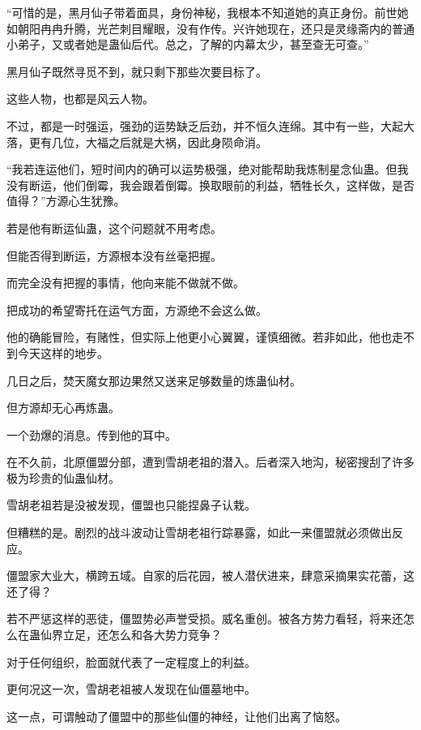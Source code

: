 
\begin{this_body}

“可惜的是，黑月仙子带着面具，身份神秘，我根本不知道她的真正身份。前世她如朝阳冉冉升腾，光芒刺目耀眼，没有作传。兴许她现在，还只是灵缘斋内的普通小弟子，又或者她是蛊仙后代。总之，了解的内幕太少，甚至查无可查。”

黑月仙子既然寻觅不到，就只剩下那些次要目标了。

这些人物，也都是风云人物。

不过，都是一时强运，强劲的运势缺乏后劲，并不恒久连绵。其中有一些，大起大落，更有几位，大福之后就是大祸，因此身陨命消。

“我若连运他们，短时间内的确可以运势极强，绝对能帮助我炼制星念仙蛊。但我没有断运，他们倒霉，我会跟着倒霉。换取眼前的利益，牺牲长久，这样做，是否值得？”方源心生犹豫。

若是他有断运仙蛊，这个问题就不用考虑。

但能否得到断运，方源根本没有丝毫把握。

而完全没有把握的事情，他向来能不做就不做。

把成功的希望寄托在运气方面，方源绝不会这么做。

他的确能冒险，有赌性，但实际上他更小心翼翼，谨慎细微。若非如此，他也走不到今天这样的地步。

几日之后，焚天魔女那边果然又送来足够数量的炼蛊仙材。

但方源却无心再炼蛊。

一个劲爆的消息。传到他的耳中。

在不久前，北原僵盟分部，遭到雪胡老祖的潜入。后者深入地沟，秘密搜刮了许多极为珍贵的仙蛊仙材。

雪胡老祖若是没被发现，僵盟也只能捏鼻子认栽。

但糟糕的是。剧烈的战斗波动让雪胡老祖行踪暴露，如此一来僵盟就必须做出反应。

僵盟家大业大，横跨五域。自家的后花园，被人潜伏进来，肆意采摘果实花蕾，这还了得？

若不严惩这样的恶徒，僵盟势必声誉受损。威名重创。被各方势力看轻，将来还怎么在蛊仙界立足，还怎么和各大势力竞争？

对于任何组织，脸面就代表了一定程度上的利益。

更何况这一次，雪胡老祖被人发现在仙僵墓地中。

这一点，可谓触动了僵盟中的那些仙僵的神经，让他们出离了恼怒。


\end{this_body}
